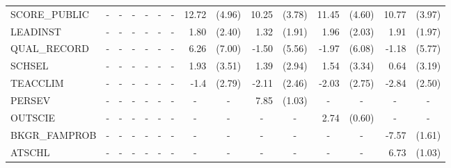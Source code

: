 \documentclass[12pt]{article}%
\begin{document}
\begin{table}[H]
\begin{tabular}{lrlrlrlrlrlrlrl}
			SCORE\_PUBLIC & \multicolumn{1}{c}{-} & \multicolumn{1}{c}{-} & \multicolumn{1}{c}{-} & \multicolumn{1}{c}{-} & \multicolumn{1}{c}{-} & \multicolumn{1}{c}{-} & 12.72 & (4.96) & 10.25 & (3.78) & 11.45 & (4.60) & 10.77 & (3.97) \\[0.2em]
			LEADINST & \multicolumn{1}{c}{-} & \multicolumn{1}{c}{-} & \multicolumn{1}{c}{-} & \multicolumn{1}{c}{-} & \multicolumn{1}{c}{-} & \multicolumn{1}{c}{-} & 1.80  & (2.40) & 1.32  & (1.91) & 1.96  & (2.03) & 1.91  & (1.97) \\[0.2em]
			QUAL\_RECORD & \multicolumn{1}{c}{-} & \multicolumn{1}{c}{-} & \multicolumn{1}{c}{-} & \multicolumn{1}{c}{-} & \multicolumn{1}{c}{-} & \multicolumn{1}{c}{-} & 6.26  & (7.00) & -1.50 & (5.56) & -1.97 & (6.08) & -1.18 & (5.77) \\[0.2em]
			SCHSEL & \multicolumn{1}{c}{-} & \multicolumn{1}{c}{-} & \multicolumn{1}{c}{-} & \multicolumn{1}{c}{-} & \multicolumn{1}{c}{-} & \multicolumn{1}{c}{-} & 1.93  & (3.51) & 1.39  & (2.94) & 1.54  & (3.34) & 0.64  & (3.19) \\[0.2em]
			TEACCLIM & \multicolumn{1}{c}{-} & \multicolumn{1}{c}{-} & \multicolumn{1}{c}{-} & \multicolumn{1}{c}{-} & \multicolumn{1}{c}{-} & \multicolumn{1}{c}{-} & -1.4  & (2.79) & -2.11 & (2.46) & -2.03 & (2.75) & -2.84 & (2.50) \\[0.2em]
			PERSEV & \multicolumn{1}{c}{-} & \multicolumn{1}{c}{-} & \multicolumn{1}{c}{-} & \multicolumn{1}{c}{-} & \multicolumn{1}{c}{-} & \multicolumn{1}{c}{-} & \multicolumn{1}{c}{-} & \multicolumn{1}{c}{-} & 7.85  & (1.03) & \multicolumn{1}{c}{-} & \multicolumn{1}{c}{-} & \multicolumn{1}{c}{-} & \multicolumn{1}{c}{-} \\[0.2em]
			OUTSCIE & \multicolumn{1}{c}{-} & \multicolumn{1}{c}{-} & \multicolumn{1}{c}{-} & \multicolumn{1}{c}{-} & \multicolumn{1}{c}{-} & \multicolumn{1}{c}{-} & \multicolumn{1}{c}{-} & \multicolumn{1}{c}{-} & \multicolumn{1}{c}{-} & \multicolumn{1}{c}{-} & 2.74  & (0.60) & \multicolumn{1}{c}{-} & \multicolumn{1}{c}{-} \\[0.2em]
			BKGR\_FAMPROB & \multicolumn{1}{c}{-} & \multicolumn{1}{c}{-} & \multicolumn{1}{c}{-} & \multicolumn{1}{c}{-} & \multicolumn{1}{c}{-} & \multicolumn{1}{c}{-} & \multicolumn{1}{c}{-} & \multicolumn{1}{c}{-} & \multicolumn{1}{c}{-} & \multicolumn{1}{c}{-} & \multicolumn{1}{c}{-} & \multicolumn{1}{c}{-} & -7.57 & (1.61) \\[0.2em]
			ATSCHL & \multicolumn{1}{c}{-} & \multicolumn{1}{c}{-} & \multicolumn{1}{c}{-} & \multicolumn{1}{c}{-} & \multicolumn{1}{c}{-} & \multicolumn{1}{c}{-} & \multicolumn{1}{c}{-} & \multicolumn{1}{c}{-} & \multicolumn{1}{c}{-} & \multicolumn{1}{c}{-} & \multicolumn{1}{c}{-} & \multicolumn{1}{c}{-} & 6.73  & (1.03) \\[0.2em]

\end{tabular}
\end{table}
\end{document}
